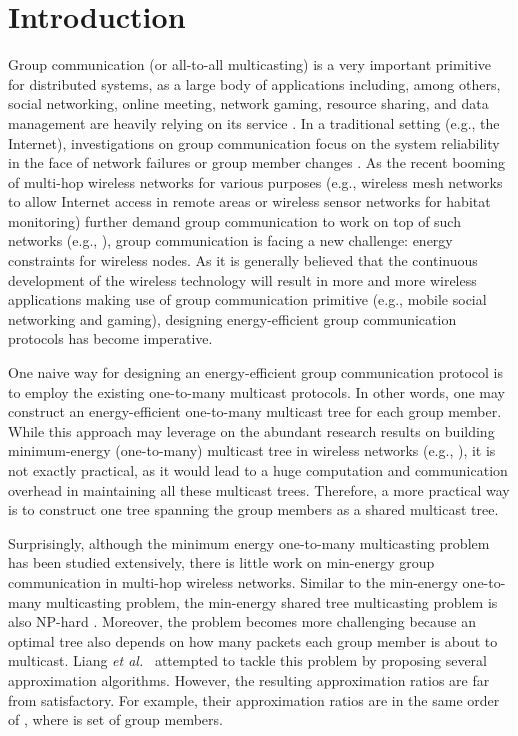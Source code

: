 \documentclass[10pt, conference, compsocconf]{IEEEtran}
\begin{document}
\section{Introduction} \label{sec:intro}
Group communication (or all-to-all multicasting) is a very important primitive for distributed systems, as a large body of applications including, among others, social networking, online meeting, network gaming, resource sharing, and data management are heavily relying on its service \cite{Powell-CACM96,Chockler-CS01}. In a traditional setting (e.g., the Internet), investigations on group communication focus on the system reliability in the face of network failures or group member changes \cite{Chockler-CS01}. As the recent booming of multi-hop wireless networks for various purposes (e.g., wireless mesh networks to allow Internet access in remote areas or wireless sensor networks for habitat monitoring) further demand group communication to work on top of such networks (e.g., \cite{YuC-MSWiM09}), group communication is facing a new challenge: energy constraints for wireless nodes. As it is generally believed that the continuous development of the wireless technology will result in more and more wireless applications making use of group communication primitive (e.g., mobile social networking and gaming), designing energy-efficient group communication protocols has become imperative.

  One naive way for designing an energy-efficient group communication protocol is to employ the existing one-to-many multicast protocols. In other words, one may construct an energy-efficient one-to-many multicast tree for each group member. While this approach may leverage on the abundant research results on building minimum-energy (one-to-many) multicast tree in wireless networks (e.g., \cite{Wieselthier2000,Wan2004,Liang2006,Li2007}), it is not exactly practical, as it would lead to a huge computation and communication overhead in maintaining all these multicast trees. Therefore, a more practical way is to construct one tree spanning the group members as a shared multicast tree.

  Surprisingly, although the minimum energy one-to-many multicasting problem has been studied extensively, there is little work on min-energy group communication in multi-hop wireless networks. Similar to the min-energy one-to-many multicasting problem, the min-energy shared tree multicasting problem is also NP-hard \cite{Liang2009}. Moreover, the problem becomes more challenging because an optimal tree also depends on how many packets each group member is about to multicast. Liang \textit{et al.}\ \cite{Liang2009} attempted to tackle this problem by proposing several approximation algorithms. However, the resulting approximation ratios are far from satisfactory. For example, their approximation ratios are in the same order of , where  is set of group members.
\end{document}
